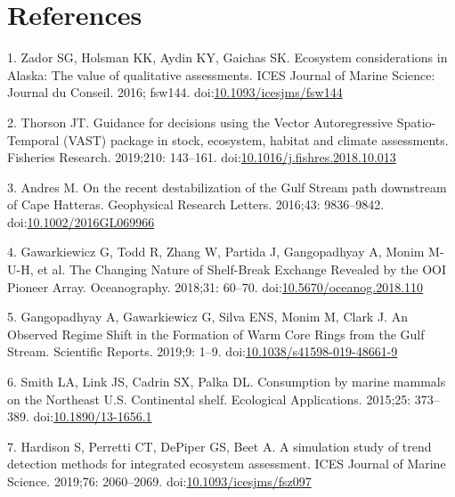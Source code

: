 \documentclass[
  10pt,
]{article}
\begin{document}
\hypertarget{references}{%
\section*{References}\label{references}}

\hypertarget{refs}{}
\leavevmode\hypertarget{ref-zador_ecosystem_2016}{}%
1. Zador SG, Holsman KK, Aydin KY, Gaichas SK. Ecosystem considerations
in Alaska: The value of qualitative assessments. ICES Journal of Marine
Science: Journal du Conseil. 2016; fsw144.
doi:\href{https://doi.org/10.1093/icesjms/fsw144}{10.1093/icesjms/fsw144}

\leavevmode\hypertarget{ref-thorson_guidance_2019}{}%
2. Thorson JT. Guidance for decisions using the Vector Autoregressive
Spatio-Temporal (VAST) package in stock, ecosystem, habitat and climate
assessments. Fisheries Research. 2019;210: 143--161.
doi:\href{https://doi.org/10.1016/j.fishres.2018.10.013}{10.1016/j.fishres.2018.10.013}

\leavevmode\hypertarget{ref-andres_recent_2016}{}%
3. Andres M. On the recent destabilization of the Gulf Stream path
downstream of Cape Hatteras. Geophysical Research Letters. 2016;43:
9836--9842.
doi:\href{https://doi.org/10.1002/2016GL069966}{10.1002/2016GL069966}

\leavevmode\hypertarget{ref-gawarkiewicz_changing_2018}{}%
4. Gawarkiewicz G, Todd R, Zhang W, Partida J, Gangopadhyay A, Monim
M-U-H, et al. The Changing Nature of Shelf-Break Exchange Revealed by
the OOI Pioneer Array. Oceanography. 2018;31: 60--70.
doi:\href{https://doi.org/10.5670/oceanog.2018.110}{10.5670/oceanog.2018.110}

\leavevmode\hypertarget{ref-gangopadhyay_observed_2019}{}%
5. Gangopadhyay A, Gawarkiewicz G, Silva ENS, Monim M, Clark J. An
Observed Regime Shift in the Formation of Warm Core Rings from the Gulf
Stream. Scientific Reports. 2019;9: 1--9.
doi:\href{https://doi.org/10.1038/s41598-019-48661-9}{10.1038/s41598-019-48661-9}

\leavevmode\hypertarget{ref-smith_consumption_2015}{}%
6. Smith LA, Link JS, Cadrin SX, Palka DL. Consumption by marine mammals
on the Northeast U.S. Continental shelf. Ecological Applications.
2015;25: 373--389.
doi:\href{https://doi.org/10.1890/13-1656.1}{10.1890/13-1656.1}

\leavevmode\hypertarget{ref-hardison_simulation_2019}{}%
7. Hardison S, Perretti CT, DePiper GS, Beet A. A simulation study of
trend detection methods for integrated ecosystem assessment. ICES
Journal of Marine Science. 2019;76: 2060--2069.
doi:\href{https://doi.org/10.1093/icesjms/fsz097}{10.1093/icesjms/fsz097}
\end{document}

